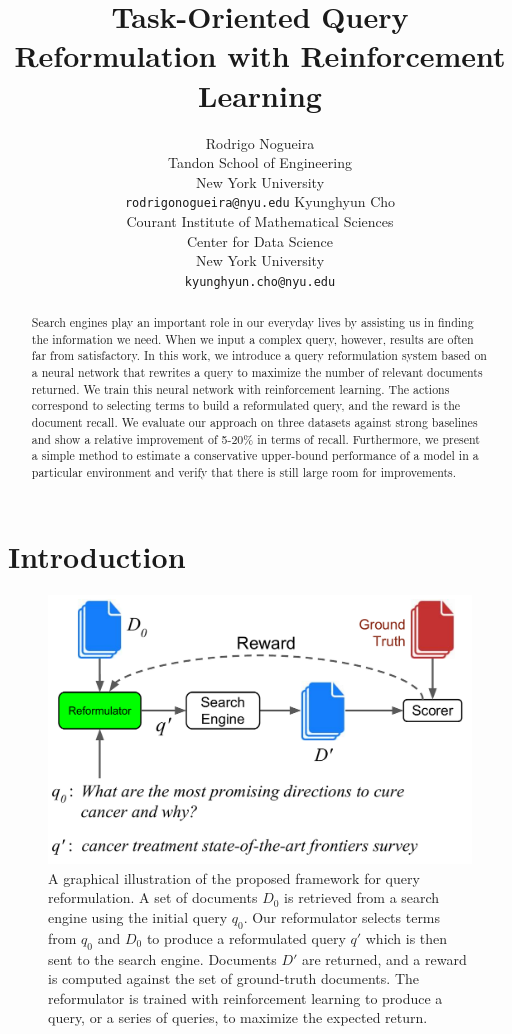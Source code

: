 \documentclass[11pt,letterpaper]{article}
\title{Task-Oriented Query Reformulation with Reinforcement Learning}
\author{Rodrigo Nogueira \\ Tandon School of Engineering\\
New York University\\
		{\tt rodrigonogueira@nyu.edu}
		\And  \And
        Kyunghyun Cho \\ Courant Institute of Mathematical Sciences\\
        Center for Data Science \\
        New York University\\
  {\tt kyunghyun.cho@nyu.edu}}
\date{}
\begin{document}
 

\maketitle

\begin{abstract} 

Search engines play an important role in our everyday lives by assisting us in finding the information we need. When we input a complex query, however, results are often far from satisfactory. In this work, we introduce a query reformulation system based on a neural network that rewrites a query to maximize the number of relevant documents returned.
We train this neural network with reinforcement learning. The actions correspond to selecting terms to build a reformulated query, and the reward is the document recall. We evaluate our approach on three datasets against strong baselines and show a relative improvement of 5-20\% in terms of recall. Furthermore, we present a simple method to estimate a conservative upper-bound performance of a model in a particular environment and verify that there is still large room for improvements.
\end{abstract}


\section{Introduction}

\begin{figure}[ht]
\begin{center}
\centerline{\includegraphics[width=\columnwidth]{query_reformulator}}
\vskip -0.1in
\caption{A graphical illustration of the proposed framework for query reformulation. A set of documents $D_0$ is retrieved from a search engine using the initial query $q_0$. Our reformulator selects terms from $q_0$ and $D_0$ to produce a reformulated query $q'$ which is then sent to the search engine. Documents $D'$ are returned, and a reward is computed against the set of ground-truth documents.
The reformulator is trained with reinforcement learning to produce a query, or a series of queries, to maximize the expected return.%
}
\label{fig:query_reformulator}
\end{center}

\vskip -4mm
\end{figure}
\end{document}
